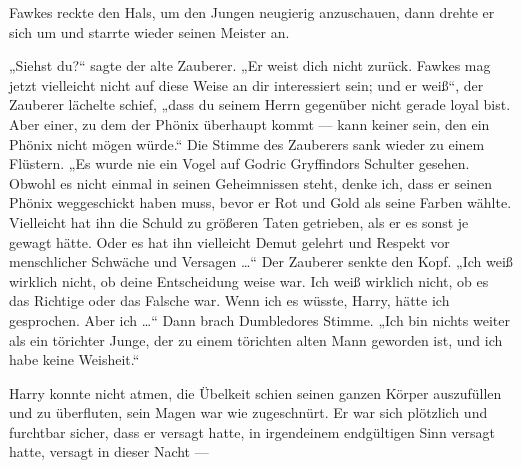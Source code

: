 Fawkes reckte den Hals, um den Jungen neugierig anzuschauen, dann drehte er sich um und starrte wieder seinen Meister an.

„Siehst du?“ sagte der alte Zauberer.
„Er weist dich nicht zurück. Fawkes mag jetzt vielleicht nicht auf diese Weise an dir interessiert sein; und er weiß“, der Zauberer lächelte schief, „dass du seinem Herrn gegenüber nicht gerade loyal bist. Aber einer, zu dem der Phönix überhaupt kommt — kann keiner sein, den ein Phönix nicht mögen würde.“
Die Stimme des Zauberers sank wieder zu einem Flüstern.
„Es wurde nie ein Vogel auf Godric Gryffindors Schulter gesehen. Obwohl es nicht einmal in seinen Geheimnissen steht, denke ich, dass er seinen Phönix weggeschickt haben muss, bevor er Rot und Gold als seine Farben wählte. Vielleicht hat ihn die Schuld zu größeren Taten getrieben, als er es sonst je gewagt hätte. Oder es hat ihn vielleicht Demut gelehrt und Respekt vor menschlicher Schwäche und Versagen …“ Der Zauberer senkte den Kopf.
„Ich weiß wirklich nicht, ob deine Entscheidung weise war. Ich weiß wirklich nicht, ob es das Richtige oder das Falsche war. Wenn ich es wüsste, Harry, hätte ich gesprochen. Aber ich …“ Dann brach Dumbledores Stimme.
„Ich bin nichts weiter als ein törichter Junge, der zu einem törichten alten Mann geworden ist, und ich habe keine Weisheit.“

Harry konnte nicht atmen, die Übelkeit schien seinen ganzen Körper auszufüllen und zu überfluten, sein Magen war wie zugeschnürt. Er war sich plötzlich und furchtbar sicher, dass er versagt hatte, in irgendeinem endgültigen Sinn versagt hatte, versagt in dieser Nacht —

